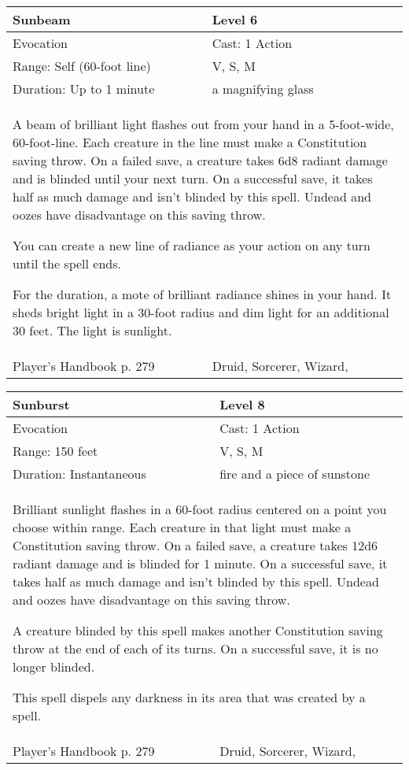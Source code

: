 \documentclass[11pt]{report}
\begin{document}
\begin{table}[H]
	\begin{tabular}{||p{6cm}|p{6cm}||}
		\hline\hline
		\bf{Sunbeam} & Level 6\\ \hline
		Evocation & Cast: 1 Action\\ \hline
		Range: Self (60-foot line) & V, S, M\\ \hline
		Duration: Up to 1 minute & a magnifying glass\\ \hline
		\multicolumn{2}{||p{12cm}||}{A beam of brilliant light flashes out from your hand in a 5-foot-wide, 60-foot-line.
Each creature in the line must make a Constitution saving throw. On a failed save, a creature takes 6d8 radiant damage and is blinded until your next turn. On a successful save, it takes half as much damage and isn’t blinded by this spell. Undead and oozes have disadvantage on this saving throw.

You can create a new line of radiance as your action on any turn until the spell ends.

For the duration, a mote of brilliant radiance shines in your hand. It sheds bright light in a 30-foot radius and dim light for an additional 30 feet. The light is sunlight.}\\ \hline
Player's Handbook p. 279 & Druid, Sorcerer, Wizard, \\ \hline\hline
	\end{tabular}
\end{table}

\begin{table}[H]
	\begin{tabular}{||p{6cm}|p{6cm}||}
		\hline\hline
		\bf{Sunburst} & Level 8\\ \hline
		Evocation & Cast: 1 Action\\ \hline
		Range: 150 feet & V, S, M\\ \hline
		Duration: Instantaneous & fire and a piece of sunstone\\ \hline
		\multicolumn{2}{||p{12cm}||}{Brilliant sunlight flashes in a 60-foot radius centered on a point you choose within range.
Each creature in that light must make a Constitution saving throw. On a failed save, a creature takes 12d6 radiant damage and is blinded for 1 minute. On a successful save, it takes half as much damage and isn’t blinded by this spell. Undead and oozes have disadvantage on this saving throw.

A creature blinded by this spell makes another Constitution saving throw at the end of each of its turns. On a successful save, it is no longer blinded.

This spell dispels any darkness in its area that was created by a spell.}\\ \hline
Player's Handbook p. 279 & Druid, Sorcerer, Wizard, \\ \hline\hline
	\end{tabular}
\end{table}
\end{document}
